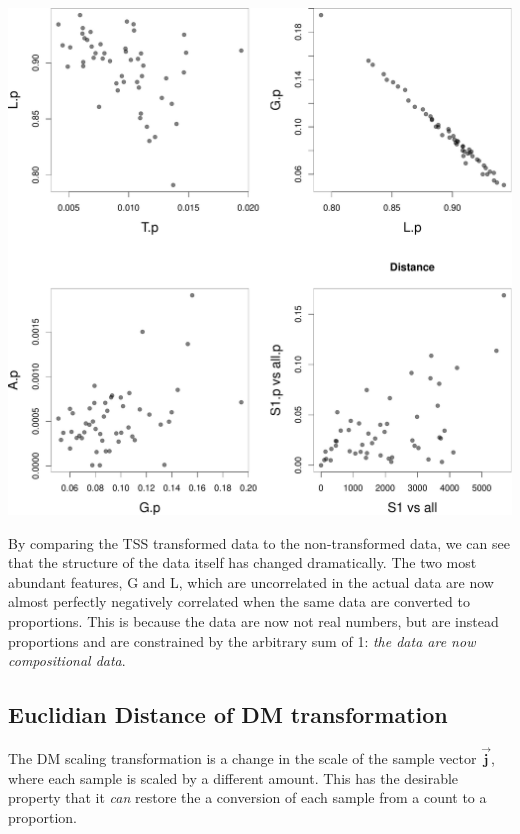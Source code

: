 \documentclass[twocolumn]{article}
\newcommand{\vect}[1]{\vec{\textbf{#1}}}
\begin{document}
\includegraphics{main_files/figure-latex/R_block_random_prop-1.pdf}

By comparing the TSS transformed data to the non-transformed data, we
can see that the structure of the data itself has changed dramatically.
The two most abundant features, G and L, which are uncorrelated in the
actual data are now almost perfectly negatively correlated when the same
data are converted to proportions. This is because the data are now not
real numbers, but are instead proportions and are constrained by the
arbitrary sum of 1: \emph{the data are now compositional data}.

\subsection{Euclidian Distance of DM transformation}

The DM scaling transformation is a change in the scale of the sample
vector \(\vect{j}\), where each sample is scaled by a different amount.
This has the desirable property that it \emph{can} restore the a
conversion of each sample from a count to a proportion.
\end{document}
